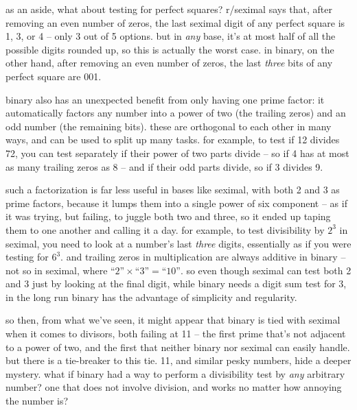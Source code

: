 \documentclass[../best.tex]{subfiles}
\begin{document}
as an aside, what about testing for perfect squares? r/seximal says that, after removing an even number of zeros, the last seximal digit of any perfect square is 1, 3, or 4 -- only 3 out of 5 options.\myfootnote{} but in \emph{any} base, it's at most half of all the possible digits rounded up, so this is actually the worst case.\myfootnote{} in binary, on the other hand, after removing an even number of zeros, the last \emph{three} bits of any perfect square are 001.\myfootnote{}

binary also has an unexpected benefit from only having one prime factor: it automatically factors any number into a power of two (the trailing zeros) and an odd number (the remaining bits). these are orthogonal to each other in many ways, and can be used to split up many tasks. for example, to test if 12 divides 72, you can test separately if their power of two parts divide -- so if 4 has at most as many trailing zeros as 8 -- and if their odd parts divide, so if 3 divides 9.\myfootnote{}

such a factorization is far less useful in bases like seximal, with both 2 and 3 as prime factors, because it lumps them into a single power of six component -- as if it was trying, but failing, to juggle both two and three, so it ended up taping them to one another and calling it a day. for example, to test divisibility by $2^3$ in seximal, you need to look at a number's last \emph{three} digits, essentially as if you were testing for $6^3$. and trailing zeros in multiplication are always additive in binary -- not so in seximal, where $\text{``2''} \times \text{``3''} = \text{``10''}$. so even though seximal can test both 2 and 3 just by looking at the final digit, while binary needs a digit sum test for 3, in the long run binary has the advantage of simplicity and regularity.\myfootnote{}

so then, from what we've seen, it might appear that binary is tied with seximal when it comes to divisors, both failing at 11 -- the first prime that's not adjacent to a power of two, and the first that neither binary nor seximal can easily handle. but there is a tie-breaker to this tie. 11, and similar pesky numbers, hide a deeper mystery. what if binary had a way to perform a divisibility test by \emph{any} arbitrary number? one that does not involve division, and works no matter how annoying the number is?
\end{document}
